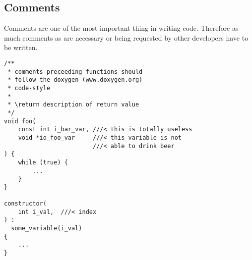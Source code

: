\documentclass[10pt,a4paper]{article}
\begin{document}
\subsection{Comments}
Comments are one of the most important thing in writing code.
Therefore as much comments as are necessary or being requested by other developers have to be written.


\begin{lstlisting}
/**
 * comments preceeding functions should
 * follow the doxygen (www.doxygen.org)
 * code-style
 *
 * \return description of return value 
 */
void foo(
    const int i_bar_var, ///< this is totally useless
    void *io_foo_var     ///< this variable is not
                         ///< able to drink beer
) {
    while (true) {
        ...
    }
}

constructor(
    int i_val,	///< index
) :
  some_variable(i_val)
{
	...
}
\end{lstlisting}
\end{document}
